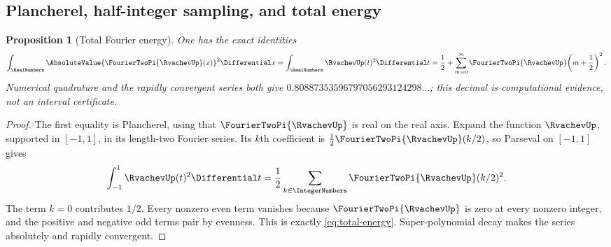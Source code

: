 \documentclass[11pt,oneside]{article}
\numberwithin{equation}{section}
\newtheorem{proposition}[theorem]{Proposition}
\theoremstyle{definition}
\theoremstyle{remark}
\begin{document}
\subsection{Plancherel, half-integer sampling, and total energy}

\begin{proposition}[Total Fourier energy]
\label{prop:total-energy}
One has the exact identities
\begin{equation}
 \int_{\RealNumbers}\AbsoluteValue{\FourierTwoPi{\RvachevUp}(x)}^2\Differential x
 =\int_{\RealNumbers}\RvachevUp(t)^2\Differential t
 =\frac12+\sum_{m=0}^{\infty}\FourierTwoPi{\RvachevUp}\!\left(m+\frac12\right)^2.
 \label{eq:total-energy}
\end{equation}
Numerical quadrature and the rapidly convergent series both give
$0.80887353596797056293124298\ldots$; this decimal is computational evidence, not an interval
certificate.
\end{proposition}

\begin{proof}
The first equality is Plancherel, using that $\FourierTwoPi{\RvachevUp}$ is real on the real axis.
Expand the function $\RvachevUp$, supported in $[-1,1]$, in its length-two Fourier series.  Its
$k$th coefficient is $\tfrac12\FourierTwoPi{\RvachevUp}(k/2)$, so Parseval on
$[-1,1]$ gives
\[
 \int_{-1}^{1}\RvachevUp(t)^2\Differential t
 =\frac12\sum_{k\in\IntegerNumbers}\FourierTwoPi{\RvachevUp}(k/2)^2.
\]
The term $k=0$ contributes $1/2$.  Every nonzero even term vanishes because $\FourierTwoPi{\RvachevUp}$ is
zero at every nonzero integer, and the positive and negative odd terms pair by evenness.
This is exactly \eqref{eq:total-energy}.  Super-polynomial decay makes the series absolutely
and rapidly convergent.
\end{proof}
\end{document}
